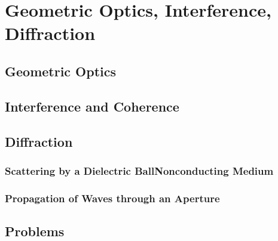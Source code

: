 \setcounter{chapter}{0}
\renewcommand{\thechapter}{7}
\chapter{Geometric Optics, Interference, Diffraction}
\setcounter{equation}{0}	        %

\section{Geometric Optics}

\section{Interference and Coherence}

\section{Diffraction}

\subsection{Scattering by a Dielectric BallNonconducting Medium}

\subsection{Propagation of Waves through an Aperture}


\section*{Problems}


